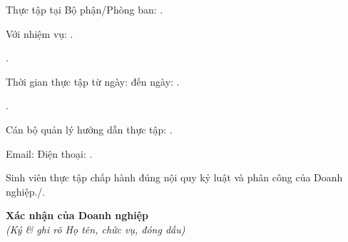 \documentclass[12pt,a4paper]{article}
\newcommand{\densedotfill}{\leavevmode\cleaders\hbox{.\hspace{1.5pt}}\hfill\kern0pt}
\begin{document}
\noindent Thực tập tại Bộ phận/Phòng ban: \densedotfill

\noindent Với nhiệm vụ: \densedotfill

\noindent \densedotfill

\noindent Thời gian thực tập từ ngày: \makebox[4cm]{\densedotfill} đến ngày: \densedotfill

\noindent \densedotfill

\noindent Cán bộ quản lý hướng dẫn thực tập: \densedotfill

\noindent Email: \makebox[6cm]{\densedotfill} Điện thoại: \densedotfill

\vspace{0.5cm}

\noindent Sinh viên thực tập chấp hành đúng nội quy kỷ luật và phân công của Doanh nghiệp./.

\vspace{1cm}

\hfill
\begin{minipage}[t]{0.5\textwidth}
\centering
\textbf{Xác nhận của Doanh nghiệp}\\
\textit{(Ký \& ghi rõ Họ tên, chức vụ, đóng dấu)}
\vspace{2.5cm}
\end{minipage}
\end{document}
